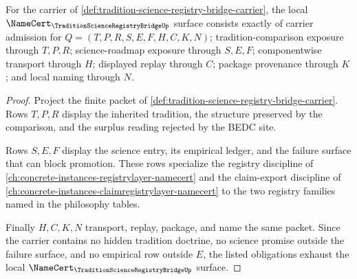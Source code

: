 \begin{theorem}
\label{thm:tradition-science-registry-bridge-obligations}
For the carrier of \autoref{def:tradition-science-registry-bridge-carrier}, the local $\NameCert_{\TraditionScienceRegistryBridgeUp}$ surface consists exactly of carrier admission for $Q=(T,P,R,S,E,F,H,C,K,N)$; tradition-comparison exposure through $T,P,R$; science-roadmap exposure through $S,E,F$; componentwise transport through $H$; displayed replay through $C$; package provenance through $K$; and local naming through $N$.
\end{theorem}
\begin{proof}
Project the finite packet of \autoref{def:tradition-science-registry-bridge-carrier}. Rows $T,P,R$ display the inherited tradition, the structure preserved by the comparison, and the surplus reading rejected by the BEDC site.

Rows $S,E,F$ display the science entry, its empirical ledger, and the failure surface that can block promotion. These rows specialize the registry discipline of \autoref{ch:concrete-instances-registrylayer-namecert} and the claim-export discipline of \autoref{ch:concrete-instances-claimregistrylayer-namecert} to the two registry families named in the philosophy tables.

Finally $H,C,K,N$ transport, replay, package, and name the same packet. Since the carrier contains no hidden tradition doctrine, no science promise outside the failure surface, and no empirical row outside $E$, the listed obligations exhaust the local $\NameCert_{\TraditionScienceRegistryBridgeUp}$ surface.
\end{proof}

